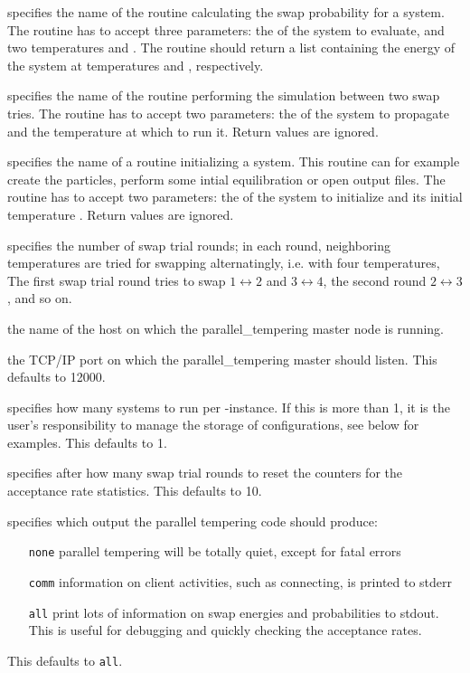 \begin{arguments}
\item[\var{swap}] specifies the name of the routine calculating the
  swap probability for a system. The routine has to accept three
  parameters: the  of the system to evaluate, and two
  temperatures  and . The routine should return a
  list containing the energy of the system at temperatures 
  and , respectively.
\item[\var{perform}] specifies the name of the routine performing the
  simulation between two swap tries. The routine has to accept two
  parameters: the  of the system to propagate and the
  temperature  at which to run it. Return values are ignored.
\item[\var{init}] specifies the name of a routine initializing a
  system. This routine can for example create the particles, perform
  some intial equilibration or open output files.  The routine has to
  accept two parameters: the  of the system to initialize and
  its initial temperature . Return values are ignored.
\item[\var{R}] specifies the number of swap trial rounds; in each
  round, neighboring temperatures are tried for swapping
  alternatingly, i.e. with four temperatures, The first swap trial
  round tries to swap $1\leftrightarrow 2$ and $3\leftrightarrow 4$,
  the second round $2\leftrightarrow 3$, and so on.
\item[\var{master}] the name of the host on which the
  parallel_tempering master node is running.
\item[\var{port}] the TCP/IP port on which the parallel_tempering
  master should listen. This defaults to 12000.
\item[\var{j_\mathrm{node}}] specifies how many systems to run per
  \es{}-instance. If this is more than 1, it is the user's
  responsibility to manage the storage of configurations, see below
  for examples.  This defaults to 1.
\item[\var{R_\mathrm{reset}}] specifies after how many swap trial
  rounds to reset the counters for the acceptance rate statistics.
  This defaults to 10.
\item[\var{info}] specifies which output the parallel tempering code
  should produce:
  \begin{itemize}
  \item[\texttt{none}] parallel tempering will be totally quiet,
    except for fatal errors
  \item[\texttt{comm}] information on client activities, such as
    connecting, is printed to stderr
  \item[\texttt{all}] print lots of information on swap energies and
    probabilities to stdout. This is useful for debugging and quickly
    checking the acceptance rates.
  \end{itemize}
  This defaults to \texttt{all}.
\end{arguments}

